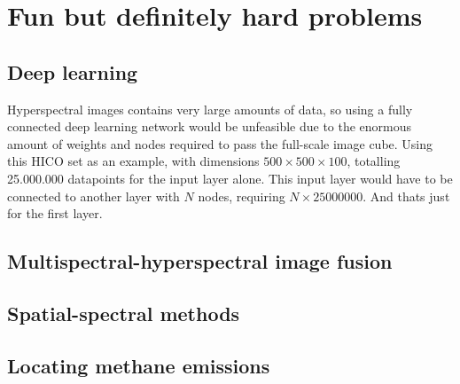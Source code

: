 \section{Fun but definitely hard problems}

\subsection{Deep learning}

Hyperspectral images contains very large amounts of data, so using a fully connected 
deep learning network would be unfeasible due to the enormous amount of weights and 
nodes required to pass the full-scale image cube. Using this HICO set as an example, 
with dimensions $500 \times 500 \times 100$, totalling 25.000.000 datapoints for the 
input layer alone. This input layer would have to be connected to another layer with 
$N$ nodes, requiring $N \times 25000000$. And thats just for the first layer. 

\subsection{Multispectral-hyperspectral image fusion}

\subsection{Spatial-spectral methods}

\subsection{Locating methane emissions}